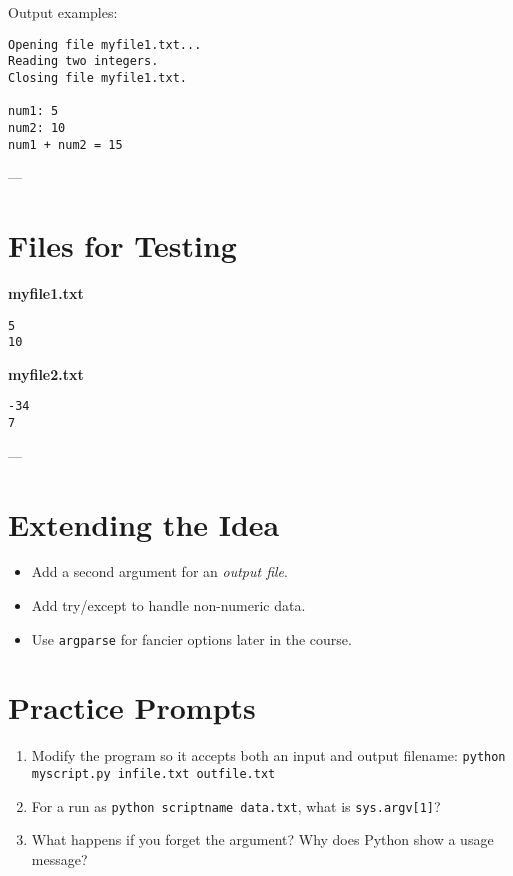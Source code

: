 \noindent
Output examples:
\begin{verbatim}
Opening file myfile1.txt...
Reading two integers.
Closing file myfile1.txt.

num1: 5
num2: 10
num1 + num2 = 15
\end{verbatim}

---

\section{Files for Testing}

\textbf{myfile1.txt}
\begin{verbatim}
5
10
\end{verbatim}

\textbf{myfile2.txt}
\begin{verbatim}
-34
7
\end{verbatim}

---

\section{Extending the Idea}
\begin{itemize}
  \item Add a second argument for an \emph{output file}.
  \item Add try/except to handle non-numeric data.
  \item Use \texttt{argparse} for fancier options later in the course.
\end{itemize}

\section*{Practice Prompts}
\begin{enumerate}
  \item Modify the program so it accepts both an input and output filename:
  \verb|python myscript.py infile.txt outfile.txt|
  \item For a run as \verb|python scriptname data.txt|, what is \verb|sys.argv[1]|?
  \item What happens if you forget the argument? Why does Python show a usage message?
\end{enumerate}
